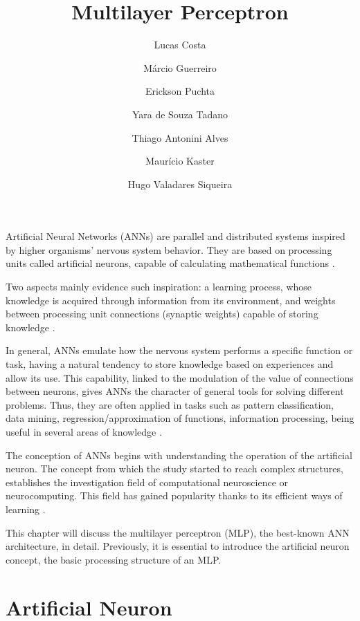 \title{Multilayer Perceptron}
\label{chp:multilayer-perceptron}
\author{Lucas Costa \and Márcio Guerreiro \and Erickson Puchta \and Yara de Souza Tadano \and Thiago Antonini Alves \and  Maurício Kaster \and Hugo Valadares Siqueira}
\institute{}
\maketitle

Artificial Neural Networks (ANNs) are parallel and distributed systems inspired by higher organisms' nervous system %
behavior. They are based on processing units called artificial neurons, capable of calculating mathematical functions \cite{haykin}.

Two aspects mainly evidence such inspiration: a learning process, whose knowledge is acquired through information from its environment, and weights between processing unit connections (synaptic weights) capable of storing knowledge \cite{Castro2006FundamentalsON}.

In general, ANNs emulate how the nervous system performs a specific function or task, having a natural %
tendency to store knowledge based on experiences and allow its use. This capability, linked to the modulation of the value of connections between neurons, gives ANNs the character of general tools for solving different problems. Thus, they are often applied in tasks such as pattern classification, data mining, regression/approximation of functions, information processing, being useful in several areas of knowledge \cite{haykin}.

The conception of ANNs begins with understanding the %
operation
of the artificial neuron. The concept from which the study started to reach complex structures, %
establishes the investigation field of computational neuroscience or neurocomputing. This field has gained popularity thanks to its efficient ways of learning \cite{Russell2009}.

This chapter will discuss the multilayer perceptron (MLP), the best-known ANN architecture, in detail. %
Previously, it is essential to introduce the artificial neuron concept, 
the basic processing structure of an MLP.

\section{Artificial Neuron}
\label{sec:neuronio}

